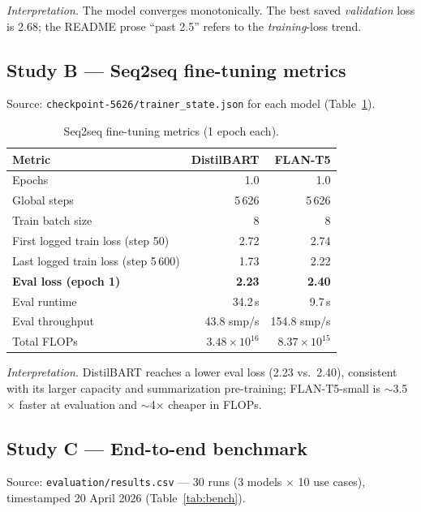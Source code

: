 \documentclass[11pt,a4paper]{article}
\begin{document}
\noindent\textit{Interpretation.} The model converges monotonically. The best
saved \emph{validation} loss is 2.68; the README prose ``past 2.5'' refers to
the \emph{training}-loss trend.

\subsection{Study B — Seq2seq fine-tuning metrics}
Source: \texttt{checkpoint-5626/trainer\_state.json} for each model
(Table~\ref{tab:ft}).

\begin{table}[h]
\centering
\caption{Seq2seq fine-tuning metrics (1 epoch each).}
\label{tab:ft}
\small
\begin{tabular}{@{}lrr@{}}
\toprule
\textbf{Metric} & \textbf{DistilBART} & \textbf{FLAN-T5} \\
\midrule
Epochs                          & 1.0 & 1.0 \\
Global steps                    & 5\,626 & 5\,626 \\
Train batch size                & 8 & 8 \\
First logged train loss (step 50)  & 2.72 & 2.74 \\
Last logged train loss (step 5\,600) & 1.73 & 2.22 \\
\textbf{Eval loss (epoch 1)}    & \textbf{2.23} & \textbf{2.40} \\
Eval runtime                    & 34.2\,s & 9.7\,s \\
Eval throughput                 & 43.8 smp/s & 154.8 smp/s \\
Total FLOPs                     & $3.48\times10^{16}$ & $8.37\times10^{15}$ \\
\bottomrule
\end{tabular}
\end{table}

\noindent\textit{Interpretation.} DistilBART reaches a lower eval loss
(2.23 vs.\ 2.40), consistent with its larger capacity and summarization
pre-training; FLAN-T5-small is $\sim$3.5$\times$ faster at evaluation and
$\sim$4$\times$ cheaper in FLOPs.

\subsection{Study C — End-to-end benchmark}
Source: \texttt{evaluation/results.csv} --- 30 runs (3 models $\times$ 10 use
cases), timestamped 20 April 2026 (Table~\ref{tab:bench}).
\end{document}
